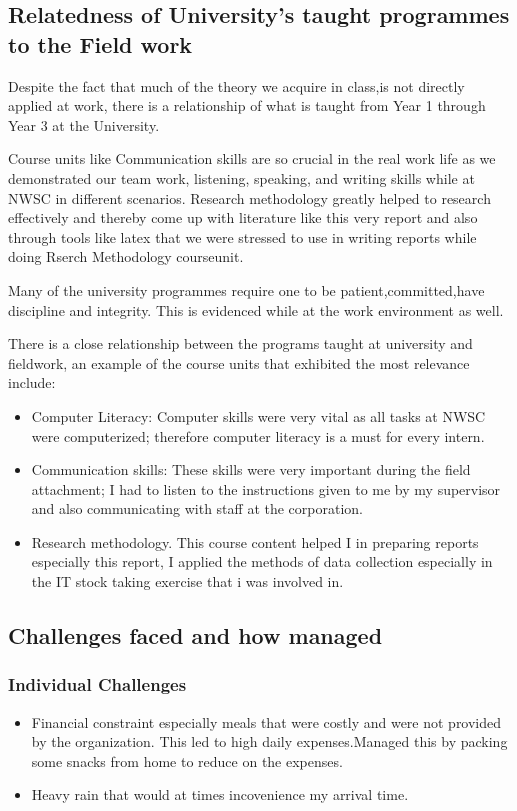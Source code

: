 \documentclass{article}
\begin{document}
\subsection{Relatedness of University’s taught programmes to the Field work}
Despite the fact that much of the theory we acquire in class,is not directly applied at work, there is a  relationship  of what is taught from Year 1 through Year 3 at the University.
\par Course units like Communication skills are so crucial in the real work life as we demonstrated
our team work, listening, speaking, and writing skills while at NWSC in different scenarios.  Research methodology greatly helped to research effectively and thereby come up with literature like this very report and also through tools like latex that we were stressed to use in writing reports while doing Rserch Methodology courseunit.
\par Many of the university programmes require one to be  patient,committed,have discipline
and integrity. This is evidenced while at the work environment as well.
\par There is a close relationship between the programs taught at university and fieldwork, an example of the course units that exhibited the most relevance include:
\begin{itemize}
\item Computer Literacy: Computer skills were very vital as all tasks at NWSC were computerized; therefore computer literacy is a must for every intern.
\item Communication skills: These skills were very important during the field attachment; I had to listen to the instructions given to me by my supervisor and also communicating with staff at the corporation.
\item Research methodology. This course content helped I in preparing reports especially this report, I applied the
methods of data collection especially in the IT stock taking exercise that i was involved in.
\end{itemize}
\subsection{Challenges faced and how managed}
\subsubsection{Individual Challenges}
\begin{itemize}
\item Financial constraint especially meals that were costly and were not provided by the organization. This led to high daily expenses.Managed this by packing some snacks from home to reduce on the expenses.
\item Heavy rain that would at times incovenience my arrival time.
\end{itemize}
\end{document}
